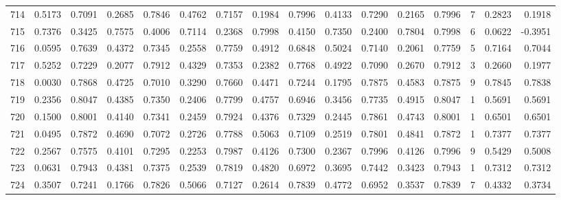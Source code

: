 \begin{tabular}{lrrrrrrrrrrrrrrr}
714 &      0.5173 &  0.7091 &  0.2685 &  0.7846 &  0.4762 &  0.7157 &  0.1984 &  0.7996 &  0.4133 &  0.7290 &   0.2165 &     0.7996 &      7 &                    0.2823 &                     0.1918 \\
715 &      0.7376 &  0.3425 &  0.7575 &  0.4006 &  0.7114 &  0.2368 &  0.7998 &  0.4150 &  0.7350 &  0.2400 &   0.7804 &     0.7998 &      6 &                    0.0622 &                    -0.3951 \\
716 &      0.0595 &  0.7639 &  0.4372 &  0.7345 &  0.2558 &  0.7759 &  0.4912 &  0.6848 &  0.5024 &  0.7140 &   0.2061 &     0.7759 &      5 &                    0.7164 &                     0.7044 \\
717 &      0.5252 &  0.7229 &  0.2077 &  0.7912 &  0.4329 &  0.7353 &  0.2382 &  0.7768 &  0.4922 &  0.7090 &   0.2670 &     0.7912 &      3 &                    0.2660 &                     0.1977 \\
718 &      0.0030 &  0.7868 &  0.4725 &  0.7010 &  0.3290 &  0.7660 &  0.4471 &  0.7244 &  0.1795 &  0.7875 &   0.4583 &     0.7875 &      9 &                    0.7845 &                     0.7838 \\
719 &      0.2356 &  0.8047 &  0.4385 &  0.7350 &  0.2406 &  0.7799 &  0.4757 &  0.6946 &  0.3456 &  0.7735 &   0.4915 &     0.8047 &      1 &                    0.5691 &                     0.5691 \\
720 &      0.1500 &  0.8001 &  0.4140 &  0.7341 &  0.2459 &  0.7924 &  0.4376 &  0.7329 &  0.2445 &  0.7861 &   0.4743 &     0.8001 &      1 &                    0.6501 &                     0.6501 \\
721 &      0.0495 &  0.7872 &  0.4690 &  0.7072 &  0.2726 &  0.7788 &  0.5063 &  0.7109 &  0.2519 &  0.7801 &   0.4841 &     0.7872 &      1 &                    0.7377 &                     0.7377 \\
722 &      0.2567 &  0.7575 &  0.4101 &  0.7295 &  0.2253 &  0.7987 &  0.4126 &  0.7300 &  0.2367 &  0.7996 &   0.4126 &     0.7996 &      9 &                    0.5429 &                     0.5008 \\
723 &      0.0631 &  0.7943 &  0.4381 &  0.7375 &  0.2539 &  0.7819 &  0.4820 &  0.6972 &  0.3695 &  0.7442 &   0.3423 &     0.7943 &      1 &                    0.7312 &                     0.7312 \\
724 &      0.3507 &  0.7241 &  0.1766 &  0.7826 &  0.5066 &  0.7127 &  0.2614 &  0.7839 &  0.4772 &  0.6952 &   0.3537 &     0.7839 &      7 &                    0.4332 &                     0.3734 \\

\end{tabular}
